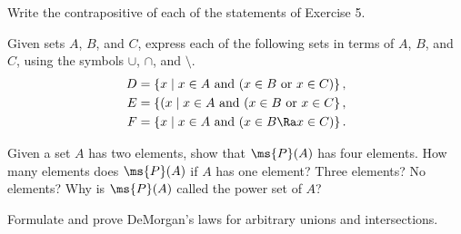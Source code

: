 
\begin{exercise}
	Write the contrapositive of each of the statements of Exercise 
	5.
\end{exercise}


\begin{exercise}
	Given sets $A$, $B$, and $C$, express each of the following 
	sets in terms of $A$, $B$, and $C$, using the symbols $\cup$, 
	$\cap$, and $\setminus$.
	\begin{align}
		D &= \{ x \mid x \in A \text{ and } (x \in B \text{ or } x 
			\in C) \}\,, \\
		E &= \{ (x \mid x \in A \text{ and } (x \in B \text{ or }
			x \in C \}\,, \\
		F &= \{ x \mid x \in A \text{ and } (x \in B \Ra x \in C) 
			\}\,.
	\end{align}
\end{exercise}


\begin{exercise}
	Given a set $A$ has two elements, show that $\ms{P}(A)$ has 
	four elements. How many elements does $\ms{P}(A)$ if $A$ has 
	one element? Three elements? No elements? Why is $\ms{P}(A)$ 
	called the power set of $A$?
\end{exercise}


\begin{exercise}
	Formulate and prove DeMorgan's laws for arbitrary unions and 
	intersections.
\end{exercise}


